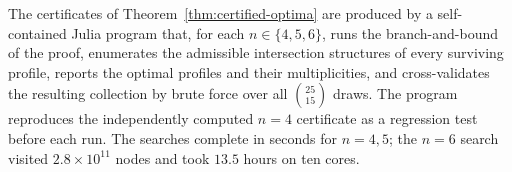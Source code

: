 The certificates of Theorem~\ref{thm:certified-optima} are produced by a
self-contained Julia program that, for each $n \in \{4,5,6\}$, runs the
branch-and-bound of the proof, enumerates the admissible intersection
structures of every surviving profile, reports the optimal profiles and
their multiplicities, and cross-validates the resulting collection by
brute force over all $\binom{25}{15}$ draws.  The program reproduces the
independently computed $n = 4$ certificate as a regression test before
each run.  The searches complete in seconds for $n = 4,5$; the $n = 6$
search visited $2.8 \times 10^{11}$ nodes and took $13.5$ hours on ten
cores.
